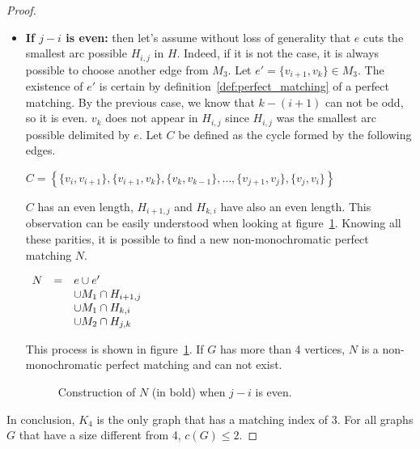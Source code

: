 \begin{proof}
\begin{itemize}
        \item 
            \textbf{If $j - i$ is even:} then let's assume without loss of generality that $e$ cuts the smallest arc possible $H_{i, j}$ in $H$.
            Indeed, if it is not the case, it is always possible to choose another edge from $M_3$.
            Let $e' = \{v_{i + 1}, v_k\} \in M_3$.
            The existence of $e'$ is certain by definition~\ref{def:perfect_matching} of a perfect matching.
            By the previous case, we know that $k - (i + 1)$ can not be odd, so it is even.
            $v_k$ does not appear in $H_{i, j}$ since $H_{i, j}$ was the smallest arc possible delimited by $e$.
            Let $C$ be defined as the cycle formed by the following edges.
            
            \begin{center}
                $C = \left\{
                    \{v_i, v_{i + 1}\}, \{v_{i+1}, v_k\}, \{v_k, v_{k - 1}\}, \dots, \{v_{j+1}, v_j\}, \{v_j, v_i\}
                \right\}$
            \end{center}
            
            $C$ has an even length, $H_{i+1, j}$ and $H_{k, i}$ have also an even length.
            This observation can be easily understood when looking at figure~\ref{fig:proof_simplified_even}.
            Knowing all these parities, it is possible to find a new non-monochromatic perfect matching $N$.
            
            \begin{center}
                $\begin{array}{r c l}
                    N & = & e \cup e' \\
                      &   & \cup M_1 \cap H_{i+1, j} \\
                      &   & \cup M_1 \cap H_{k, i} \\
                      &   & \cup M_2 \cap H_{j, k}
                \end{array}$
            \end{center}
            
            This process is shown in figure~\ref{fig:proof_simplified_even}.
            If $G$ has more than 4 vertices, $N$ is a non-monochromatic perfect matching and can not exist.
            
            \begin{figure}[H]
                \caption{Construction of $N$ (in bold) when $j - i$ is even.}
                \label{fig:proof_simplified_even}
            \end{figure}
    \end{itemize}

    In conclusion, $K_4$ is the only graph that has a matching index of 3.
    For all graphs $G$ that have a size different from 4, $c(G) \leq 2$.
\end{proof}


